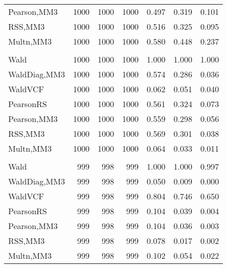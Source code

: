 \documentclass[
]{article}
\begin{document}
\begin{table}[H]
{\begin{tabular}[t]{lrrrrrr}
\hspace{1em}Pearson,MM3 & 1000 & 1000 & 1000 & 0.497 & 0.319 & 0.101\\
\hspace{1em}RSS,MM3 & 1000 & 1000 & 1000 & 0.516 & 0.325 & 0.095\\
\hspace{1em}Multn,MM3 & 1000 & 1000 & 1000 & 0.580 & 0.448 & 0.237\\
\addlinespace[0.3em]
\multicolumn{7}{l}{\textbf{1F 15V}}\\
\hspace{1em}Wald & 1000 & 1000 & 1000 & 1.000 & 1.000 & 1.000\\
\hspace{1em}WaldDiag,MM3 & 1000 & 1000 & 1000 & 0.574 & 0.286 & 0.036\\
\hspace{1em}WaldVCF & 1000 & 1000 & 1000 & 0.062 & 0.051 & 0.040\\
\hspace{1em}PearsonRS & 1000 & 1000 & 1000 & 0.561 & 0.324 & 0.073\\
\hspace{1em}Pearson,MM3 & 1000 & 1000 & 1000 & 0.559 & 0.298 & 0.056\\
\hspace{1em}RSS,MM3 & 1000 & 1000 & 1000 & 0.569 & 0.301 & 0.038\\
\hspace{1em}Multn,MM3 & 1000 & 1000 & 1000 & 0.064 & 0.033 & 0.011\\
\addlinespace[0.3em]
\multicolumn{7}{l}{\textbf{2F 10V}}\\
\hspace{1em}Wald & 999 & 998 & 999 & 1.000 & 1.000 & 0.997\\
\hspace{1em}WaldDiag,MM3 & 999 & 998 & 999 & 0.050 & 0.009 & 0.000\\
\hspace{1em}WaldVCF & 999 & 998 & 999 & 0.804 & 0.746 & 0.650\\
\hspace{1em}PearsonRS & 999 & 998 & 999 & 0.104 & 0.039 & 0.004\\
\hspace{1em}Pearson,MM3 & 999 & 998 & 999 & 0.104 & 0.036 & 0.003\\
\hspace{1em}RSS,MM3 & 999 & 998 & 999 & 0.078 & 0.017 & 0.002\\
\hspace{1em}Multn,MM3 & 999 & 998 & 999 & 0.102 & 0.054 & 0.022\\

\end{tabular}}
\end{table}
\end{document}
